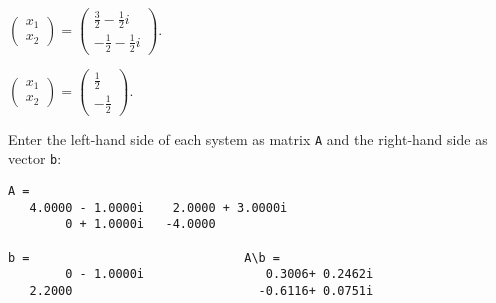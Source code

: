 $\left(\begin{array}{c} x_1 \\ x_2\end{array}\right) =
\left(\begin{array}{r} \frac{3}{2} - \frac{1}{2}i \\ -\frac{1}{2} -
\frac{1}{2}i\end{array}\right).$

$\left(\begin{array}{c} x_1 \\ x_2\end{array}\right) =
\left(\begin{array}{r} \frac{1}{2} \\ -\frac{1}{2} \end{array}\right)$.

Enter the left-hand side of each system as matrix {\tt A} 
and the right-hand side as vector {\tt b}:

\begin{verbatim}
A =
   4.0000 - 1.0000i    2.0000 + 3.0000i
        0 + 1.0000i   -4.0000          

b =                              A\b =
        0 - 1.0000i                 0.3006+ 0.2462i
   2.2000                          -0.6116+ 0.0751i
\end{verbatim}






















